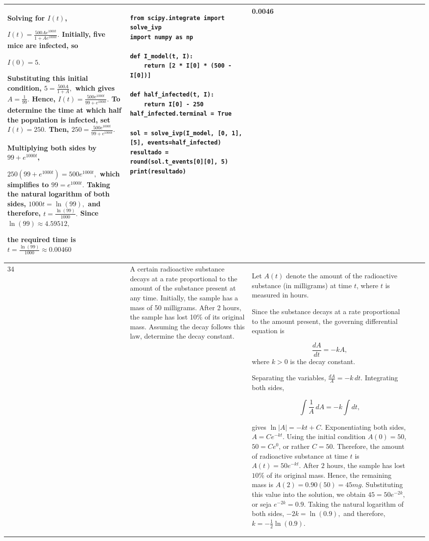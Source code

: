 \documentclass[a4paper,12pt]{article}
\begin{document}
\begin{longtable}{|p{0.3cm}|p{}|p{10cm}|p{}|p{1.5cm}|}
Solving for \(I(t)\),

$
I(t)=\frac{500Ae^{1000t}}{1+Ae^{1000t}}.$
Initially, five mice are infected, so

$
I(0)=5.$

Substituting this initial condition,
$5=\frac{500A}{1+A}, $ which gives $A=\frac{1}{99}.$
Hence,
$I(t)=\frac{500e^{1000t}}{99+e^{1000t}}.$
To determine the time at which half the population is infected, set
$I(t)=250.$
Then, $250=\frac{500e^{1000t}}{99+e^{1000t}}.$

Multiplying both sides by \(99+e^{1000t}\),

$250(99+e^{1000t})=500e^{1000t},$
which simplifies to
$99=e^{1000t}.$
Taking the natural logarithm of both sides,
$1000t=\ln(99),$
and therefore, $t=\frac{\ln(99)}{1000}.$
Since 
$\ln(99)\approx4.59512,$

the required time is $t=\frac{\ln(99)}{1000}\approx0.00460$

             &\begin{verbatim}
from scipy.integrate import solve_ivp
import numpy as np

def I_model(t, I):
    return [2 * I[0] * (500 - I[0])]

def half_infected(t, I):
    return I[0] - 250
half_infected.terminal = True

sol = solve_ivp(I_model, [0, 1], [5], events=half_infected)
resultado = round(sol.t_events[0][0], 5)
print(resultado)
\end{verbatim}&  0.0046                \\ \hline
     34            & A certain radioactive substance decays at a rate proportional to the amount of the substance present at any time. Initially, the sample has a mass of 50 milligrams. After 2 hours, the sample has lost 10\% of its original mass. Assuming the decay follows this law, determine the decay constant.
             & Let \(A(t)\) denote the amount of the radioactive substance (in milligrams) at time \(t\), where \(t\) is measured in hours.

Since the substance decays at a rate proportional to the amount present, the governing differential equation is

\[
\frac{dA}{dt}=-kA,
\]  where \(k>0\) is the decay constant.

Separating the variables,
$\frac{dA}{A}=-k\,dt.$
Integrating both sides,

\[
\int\frac{1}{A}\,dA=-k\int dt,
\]

gives $\ln|A|=-kt+C.$
Exponentiating both sides,
$A=Ce^{-kt}.$
Using the initial condition \(A(0)=50\),
$50=Ce^{0}$, or rather
 $C=50.$
Therefore, the amount of radioactive substance at time \(t\) is
$A(t)=50e^{-kt}.$
After \(2\) hours, the sample has lost \(10\%\) of its original mass. Hence, the remaining mass is $A(2)=0.90(50)=45mg.$
Substituting this value into the solution, we obtain
$45=50e^{-2k},$
or seja
$e^{-2k}=0.9.$
Taking the natural logarithm of both sides,
$-2k=\ln(0.9),$
and therefore,
$k=-\frac{1}{2}\ln(0.9).$


\end{longtable}
\end{document}
